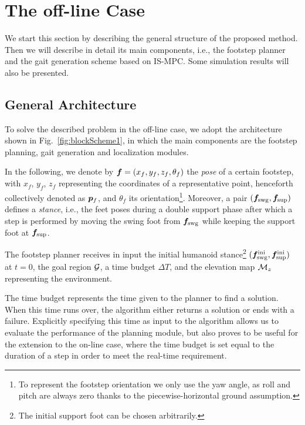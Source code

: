 \section{The off-line Case} 
\label{sec:offlineCase}

We start this section by describing the general structure of the proposed method. Then we will describe in detail its main components, i.e., the footstep planner and the gait generation scheme based on IS-MPC. Some simulation results will also be presented.   

\subsection{General Architecture}
\label{sec:offlineCase:GeneralArchitecture}

To solve the described problem in the off-line case, we adopt the architecture shown in Fig.~\ref{fig:blockScheme1}, in which the main components are the footstep planning, gait generation and localization modules.

In the following, we denote by ${\bm{f}} = (x_{f}, y_{f}, z_{f}, \theta_{f})$ the {\em pose} of a certain footstep, with $x_{f}$, $y_{f}$, $z_{f}$ representing the coordinates of a representative point, henceforth collectively denoted as ${\bm{p}}_f$, and $\theta_{f}$ its orientation\footnote{To represent the footstep orientation we only use the yaw angle, as roll and pitch are always zero thanks to the piecewise-horizontal ground assumption.}.
Moreover, a pair $({\bm{f}}_{\rm swg}, {\bm{f}}_{\rm sup})$ defines a {\em stance}, i.e., the feet poses during a double support phase after which a step is performed by moving the swing foot from ${\bm{f}}_{\rm swg}$ while keeping the support foot at ${\bm{f}}_{\rm sup}$. 

The footstep planner receives in input the initial humanoid stance\footnote{The initial support foot can be chosen arbitrarily.} $({\bm{f}}_{\rm swg}^{\rm ini}, {\bm{f}}_{\rm sup}^{\rm ini})$ at $t=0$, the goal region $\cal G$, a time budget $\Delta T$, and the elevation map ${\cal M}_z$ representing the environment.

The time budget represents the time given to the planner to find a solution. When this time runs over, the algorithm either returns a solution or ends with a failure. Explicitly specifying this time as input to the algorithm allows us to evaluate the performance of the planning module, but also proves to be useful for the extension to the on-line case, where the time budget is set equal to the duration of a step in order to meet the real-time requirement.

